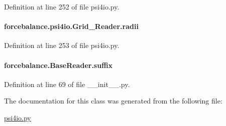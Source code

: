 Definition at line 252 of file psi4io.\-py.

\hypertarget{classforcebalance_1_1psi4io_1_1Grid__Reader_a82c8a907130461776b26605ee022f951}{
\paragraph[{radii}]{\setlength{\rightskip}{0pt plus 5cm}forcebalance.\-psi4io.\-Grid\-\_\-\-Reader.\-radii}}\label{classforcebalance_1_1psi4io_1_1Grid__Reader_a82c8a907130461776b26605ee022f951}


Definition at line 253 of file psi4io.\-py.

\hypertarget{classforcebalance_1_1BaseReader_a48ef0584a1b6b4b6f8eb741ad8465db8}{
\paragraph[{suffix}]{\setlength{\rightskip}{0pt plus 5cm}forcebalance.\-Base\-Reader.\-suffix\hspace{0.3cm}{\ttfamily [inherited]}}}\label{classforcebalance_1_1BaseReader_a48ef0584a1b6b4b6f8eb741ad8465db8}


Definition at line 69 of file \-\_\-\-\_\-init\-\_\-\-\_\-.\-py.



The documentation for this class was generated from the following file\-:\begin{DoxyCompactItemize}
\item 
\hyperlink{psi4io_8py}{psi4io.\-py}\end{DoxyCompactItemize}
